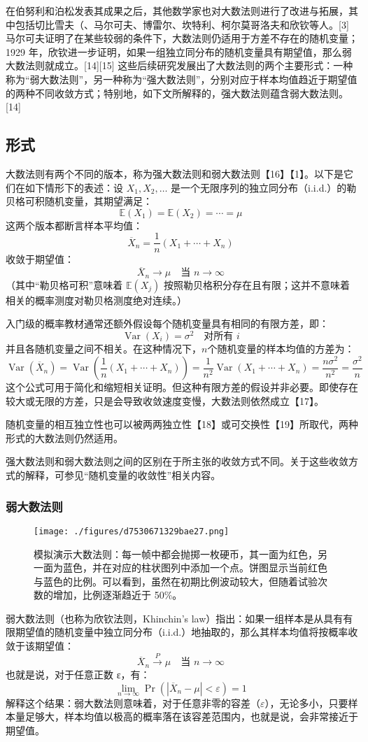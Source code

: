 在伯努利和泊松发表其成果之后，其他数学家也对大数法则进行了改进与拓展，其中包括切比雪夫（、马尔可夫、博雷尔、坎特利、柯尔莫哥洛夫和欣钦等人。[3] 马尔可夫证明了在某些较弱的条件下，大数法则仍适用于方差不存在的随机变量；1929 年，欣钦进一步证明，如果一组独立同分布的随机变量具有期望值，那么弱大数法则就成立。[14][15] 这些后续研究发展出了大数法则的两个主要形式：一种称为“弱大数法则”，另一种称为“强大数法则”，分别对应于样本均值趋近于期望值的两种不同收敛方式；特别地，如下文所解释的，强大数法则蕴含弱大数法则。[14]
\subsection{形式}
大数法则有两个不同的版本，称为强大数法则和弱大数法则【16】【1】。以下是它们在如下情形下的表述：设 $X_1, X_2, \dots$ 是一个无限序列的独立同分布（i.i.d.）的勒贝格可积随机变量，其期望满足：
$$
\mathbb{E}(X_1) = \mathbb{E}(X_2) = \cdots = \mu~
$$
这两个版本都断言样本平均值：
$$
\overline{X}_n = \frac{1}{n}(X_1 + \cdots + X_n)~
$$
收敛于期望值：
$$
\overline{X}_n \to \mu \quad \text{当 } n \to \infty~
$$
（其中“勒贝格可积”意味着 $\mathbb{E}(X_j)$ 按照勒贝格积分存在且有限；这并不意味着相关的概率测度对勒贝格测度绝对连续。）

入门级的概率教材通常还额外假设每个随机变量具有相同的有限方差，即：
$$
\operatorname{Var}(X_i) = \sigma^2 \quad \text{对所有 } i~
$$
并且各随机变量之间不相关。在这种情况下，$n$个随机变量的样本均值的方差为：
$$
\operatorname{Var}(\overline{X}_n) = \operatorname{Var}\left(\frac{1}{n}(X_1 + \cdots + X_n)\right) = \frac{1}{n^2} \operatorname{Var}(X_1 + \cdots + X_n) = \frac{n\sigma^2}{n^2} = \frac{\sigma^2}{n}~
$$
这个公式可用于简化和缩短相关证明。但这种有限方差的假设并非必要。即使存在较大或无限的方差，只是会导致收敛速度变慢，大数法则依然成立【17】。

随机变量的相互独立性也可以被两两独立性【18】或可交换性【19】所取代，两种形式的大数法则仍然适用。

强大数法则和弱大数法则之间的区别在于所主张的收敛方式不同。关于这些收敛方式的解释，可参见“随机变量的收敛性”相关内容。
\subsubsection{弱大数法则}
\begin{figure}[ht]
\centering
\texttt{[image: ./figures/d7530671329bae27.png]}
\caption{模拟演示大数法则：每一帧中都会抛掷一枚硬币，其一面为红色，另一面为蓝色，并在对应的柱状图列中添加一个点。饼图显示当前红色与蓝色的比例。可以看到，虽然在初期比例波动较大，但随着试验次数的增加，比例逐渐趋近于 50\%。} \label{fig_DSdl_4}
\end{figure}
弱大数法则（也称为欣钦法则，Khinchin's law）指出：如果一组样本是从具有有限期望值的随机变量中独立同分布（i.i.d.）地抽取的，那么其样本均值将按概率收敛于该期望值：
$$
\overline{X}_n \xrightarrow{P} \mu \quad \text{当 } n \to \infty~
$$
也就是说，对于任意正数 ε，有：
$$
\lim_{n \to \infty} \Pr\left(|\overline{X}_n - \mu| < \varepsilon\right) = 1~
$$
解释这个结果：弱大数法则意味着，对于任意非零的容差（$\varepsilon$），无论多小，只要样本量足够大，样本均值以极高的概率落在该容差范围内，也就是说，会非常接近于期望值。

